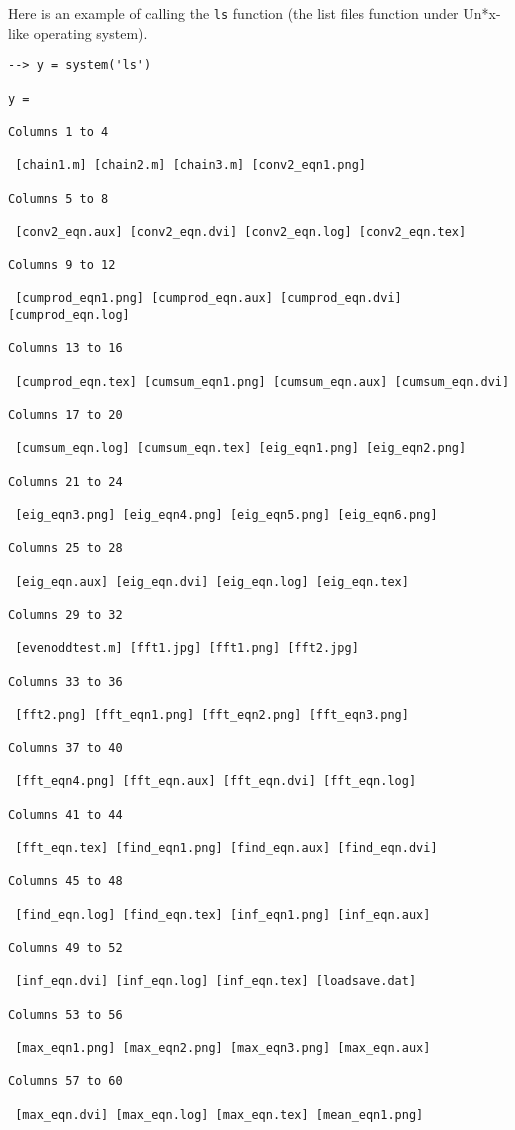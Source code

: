 Here is an example of calling the \verb|ls| function (the
list files function under Un*x-like operating system).
\begin{verbatim}
--> y = system('ls')

y = 
 
Columns 1 to 4

 [chain1.m] [chain2.m] [chain3.m] [conv2_eqn1.png] 
 
Columns 5 to 8

 [conv2_eqn.aux] [conv2_eqn.dvi] [conv2_eqn.log] [conv2_eqn.tex] 
 
Columns 9 to 12

 [cumprod_eqn1.png] [cumprod_eqn.aux] [cumprod_eqn.dvi] [cumprod_eqn.log] 
 
Columns 13 to 16

 [cumprod_eqn.tex] [cumsum_eqn1.png] [cumsum_eqn.aux] [cumsum_eqn.dvi] 
 
Columns 17 to 20

 [cumsum_eqn.log] [cumsum_eqn.tex] [eig_eqn1.png] [eig_eqn2.png] 
 
Columns 21 to 24

 [eig_eqn3.png] [eig_eqn4.png] [eig_eqn5.png] [eig_eqn6.png] 
 
Columns 25 to 28

 [eig_eqn.aux] [eig_eqn.dvi] [eig_eqn.log] [eig_eqn.tex] 
 
Columns 29 to 32

 [evenoddtest.m] [fft1.jpg] [fft1.png] [fft2.jpg] 
 
Columns 33 to 36

 [fft2.png] [fft_eqn1.png] [fft_eqn2.png] [fft_eqn3.png] 
 
Columns 37 to 40

 [fft_eqn4.png] [fft_eqn.aux] [fft_eqn.dvi] [fft_eqn.log] 
 
Columns 41 to 44

 [fft_eqn.tex] [find_eqn1.png] [find_eqn.aux] [find_eqn.dvi] 
 
Columns 45 to 48

 [find_eqn.log] [find_eqn.tex] [inf_eqn1.png] [inf_eqn.aux] 
 
Columns 49 to 52

 [inf_eqn.dvi] [inf_eqn.log] [inf_eqn.tex] [loadsave.dat] 
 
Columns 53 to 56

 [max_eqn1.png] [max_eqn2.png] [max_eqn3.png] [max_eqn.aux] 
 
Columns 57 to 60

 [max_eqn.dvi] [max_eqn.log] [max_eqn.tex] [mean_eqn1.png] 
 

\end{verbatim}
